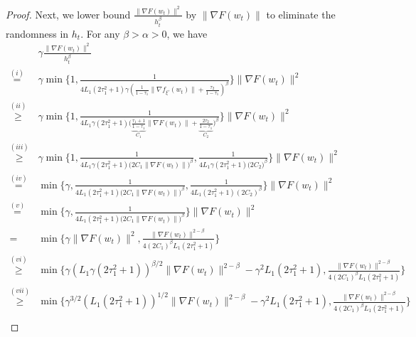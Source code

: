 \documentclass[10pt]{article} %
\newtheorem{proof}{Proof}
\begin{document}
\begin{proof}
    Next, we lower bound $ \frac{ \| \nabla F(w_t) \|^2}{h_t^{\beta}} $ by $\| \nabla F(w_t)\|$ to eliminate the randomness in $h_t$. For any $\beta>\alpha>0$, we have
\begin{align}
    &\gamma\frac{ \big \| \nabla F(w_t) \big \|^2}{h_t^{\beta}} \nonumber\\
    \overset{(i)}{=}&\gamma \min \Big\{1,\frac{1}{4L_1(2\tau_1^2+1)\gamma(\frac{1}{1-\tau_1}\big \|\nabla f_{\xi'}(w_t) \big \|+\frac{\tau_2}{1-\tau_1})^\beta}  \Big \} \big \|\nabla F(w_t) \big \|^2 \nonumber \\
    \overset{(ii)}{\geq}& \gamma \min \Big\{1,\frac{1}{4L_1\gamma(2\tau_1^2+1)\big(\underbrace{\frac{\tau_1+1}{1-\tau_1}}_{C_1}\big \|\nabla F(w_t) \big \|+\underbrace{\frac{2\tau_2}{1-\tau_1}}_{C_2} \big)^{\beta}}  \Big \} \big \|\nabla F(w_t) \big \|^2 \nonumber \\
    \overset{(iii)}{\geq}& \gamma \min \Big\{1,\frac{1}{4L_1\gamma(2\tau_1^2+1) \big(2C_1\big \|\nabla F(w_t) \big \|\big)^{\beta}}, \frac{1}{4L_1\gamma(2\tau_1^2+1)\big( 2C_2\big)^{\beta}}  \Big \} \big \|\nabla F(w_t) \big \|^2 \nonumber \\
    \overset{(iv)}{=}&\min \Big \{\gamma, \frac{1}{4L_1(2\tau_1^2+1)\big(2C_1\big \|\nabla F(w_t) \big \|\big)^{\beta}}, \frac{1}{4L_1(2\tau_1^2+1)(2C_2)^{\beta}} \Big\} \big \|\nabla F(w_t) \big \|^2 \nonumber \\
    \overset{(v)}{=}& \min \Big \{\gamma, \frac{1}{4L_1(2\tau_1^2+1)\big(2C_1\big \|\nabla F(w_t) \big \|\big)^{\beta}} \Big\} \big \|\nabla F(w_t) \big \|^2 \nonumber \\
    \overset{}{=}& \min \Big \{ \gamma \big \|\nabla F(w_t) \big \|^2 ,\frac{\big \|\nabla F(w_t) \big \|^{2-\beta}}{4(2C_1)^{\beta} L_1(2\tau_1^2+1)}\Big \}\nonumber\\
    \overset{(vi)}{\geq}& \min\{\gamma (L_1\gamma(2\tau_1^2+1))^{\beta/2}\|\nabla F(w_t) \|^{2-\beta}-\gamma^2L_1(2\tau_1^2+1),\frac{\big \|\nabla F(w_t) \big \|^{2-\beta}}{4(2C_1)^{\beta} L_1(2\tau_1^2+1)}\} \nonumber\\
    \overset{(vii)}\geq& \min\{\gamma^{{3}/{2}} (L_1(2\tau_1^2+1))^{1/2}\|\nabla F(w_t) \|^{2-\beta}-\gamma^2L_1(2\tau_1^2+1),\frac{\big \|\nabla F(w_t) \big \|^{2-\beta}}{4(2C_1)^{\beta} L_1(2\tau_1^2+1)}\} \nonumber\\

\end{align}
\end{proof}
\end{document}

